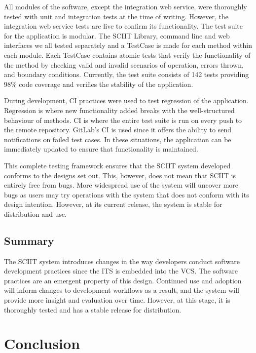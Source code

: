 \documentclass{mproj}
\begin{document}
All modules of the software, except the integration web service, were thoroughly tested with unit and integration tests at the time of writing. However, the integration web service tests are live to confirm its functionality. The test suite for the application is modular. The SCIIT Library, command line and web interfaces we all tested separately and a TestCase is made for each method within each module. Each TestCase contains atomic tests that verify the functionality of the method by checking valid and invalid scenarios of operation, errors thrown, and boundary conditions. Currently, the test suite consists of 142 tests providing 98\% code coverage and verifies the stability of the application.

During development, CI practices were used to test regression of the application. Regression is where new functionality added breaks with the well-structured behaviour of methods. CI is where the entire test suite is run on every push to the remote repository. GitLab’s CI is used since it offers the ability to send notifications on failed test cases. In these situations, the application can be immediately updated to ensure that functionality is maintained.

This complete testing framework ensures that the SCIIT system developed conforms to the designs set out. This, however, does not mean that SCIIT is entirely free from bugs. More widespread use of the system will uncover more bugs as users may try operations with the system that does not conform with its design intention. However, at its current release, the system is stable for distribution and use.

\section{Summary}

The SCIIT system introduces changes in the way developers conduct software development practices since the ITS is embedded into the VCS. The software practices are an emergent property of this design. Continued use and adoption will inform changes to development workflows as a result, and the system will provide more insight and evaluation over time. However, at this stage, it is thoroughly tested and has a stable release for distribution.


\chapter{Conclusion}\label{conclusion}
\end{document}
